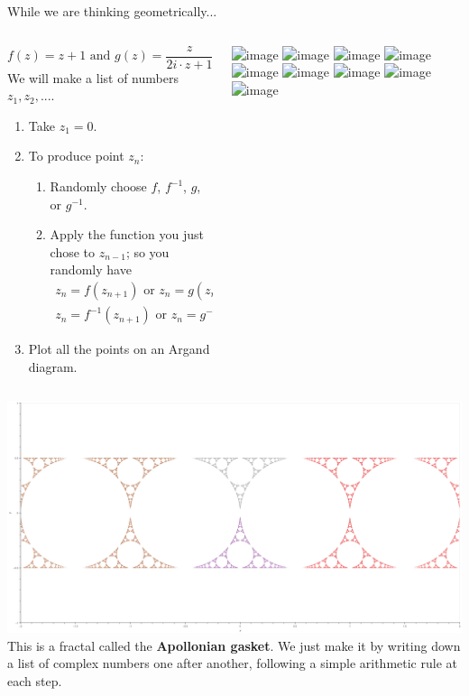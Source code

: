 \documentclass[aspectratio=169]{beamer}
\begin{document}
\begin{frame}{While we are thinking geometrically...}
\begin{columns}
\begin{column}{.5\textwidth}
\begin{displaymath}
  f(z) = z + 1 \text{ and } g(z) = \frac{z}{2i \cdot z + 1}.
\end{displaymath}
We will make a list of numbers $ z_1, z_2, ... $.
\begin{enumerate}
  \item Take $ z_1 = 0 $.
  \item To produce point $ z_n $:
  \begin{enumerate}
    \item Randomly choose $ f $, $ f^{-1} $, $ g $, or $ g^{-1} $.
    \item Apply the function you just chose to $ z_{n-1} $; so you randomly have
      \begin{gather*}
        z_n = f(z_{n+1}) \text{ or } z_n = g(z_{n+1}) \text{ or}\\
        z_n = f^{-1}(z_{n+1}) \text{ or } z_n = g^{-1}(z_{n+1})
      \end{gather*}
  \end{enumerate}
  \item Plot all the points on an Argand diagram.
\end{enumerate}
\end{column}
\begin{column}{.5\textwidth}
\begin{overprint}
\includegraphics<1>[width=\textwidth]{plot_0}
\includegraphics<2>[width=\textwidth]{plot_1}
\includegraphics<3>[width=\textwidth]{plot_1b}
\includegraphics<4>[width=\textwidth]{plot_2}
\includegraphics<5>[width=\textwidth]{plot_2b}
\includegraphics<6>[width=\textwidth]{plot_3}
\includegraphics<7>[width=\textwidth]{plot_4}
\includegraphics<8>[width=\textwidth]{plot_5}
\includegraphics<9>[width=\textwidth]{plot_6}
\end{overprint}
\end{column}
\end{columns}
\end{frame}

\begin{frame}
\includegraphics[width=\textwidth]{../../zoo/apollonian_gasket.png}
This is a fractal called the \textbf{Apollonian gasket}. We just make it by writing down a list of complex numbers one after another,
following a simple arithmetic rule at each step.
\end{frame}
\end{document}
